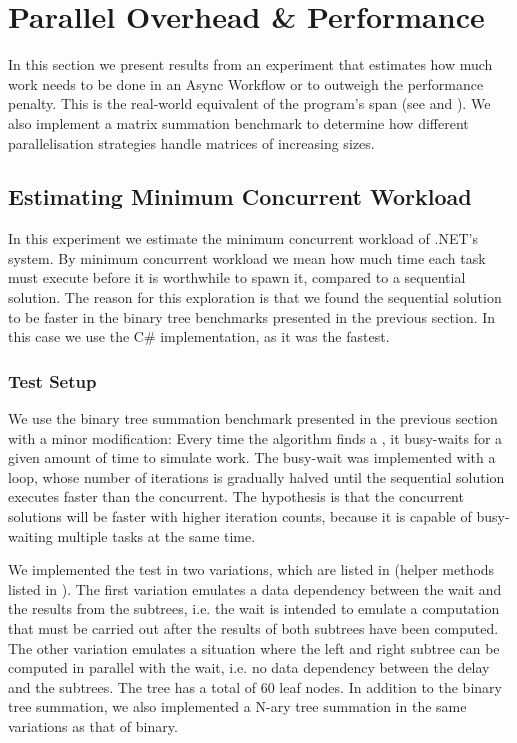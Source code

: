 \section{Parallel Overhead \& Performance}\label{sec:crit:work}
In this section we present results from an experiment that estimates how much work needs to be done in an Async Workflow or  to outweigh the performance penalty. This is the real-world equivalent of the program's span (see  and ). We also implement a matrix summation benchmark to determine how different parallelisation strategies handle matrices of increasing sizes.

\subsection{Estimating Minimum Concurrent Workload}
In this experiment we estimate the minimum concurrent workload of .NET's  system. By minimum concurrent workload we mean how much time each task must execute before it is worthwhile to spawn it, compared to a sequential solution. The reason for this exploration is that we found the sequential solution to be faster in the binary tree benchmarks presented in the previous section. In this case we use the C\# implementation, as it was the fastest.

\subsubsection{Test Setup}\label{sec:crit-work-setup}
We use the binary tree summation benchmark presented in the previous section with a minor modification: Every time the algorithm finds a , it busy-waits for a given amount of time to simulate work. The busy-wait was implemented with a loop, whose number of iterations is gradually halved until the sequential solution executes faster than the concurrent. The hypothesis is that the concurrent solutions will be faster with higher iteration counts, because it is capable of busy-waiting multiple tasks at the same time.

We implemented the test in two variations, which are listed in  (helper methods listed in ). The first variation emulates a data dependency between the wait and the results from the subtrees, i.e. the wait is intended to emulate a computation that must be carried out after the results of both subtrees have been computed. The other variation emulates a situation where the left and right subtree can be computed in parallel with the wait, i.e. no data dependency between the delay and the subtrees. The tree has a total of 60 leaf nodes. In addition to the binary tree summation, we also implemented a N-ary tree summation in the same variations as that of binary.

